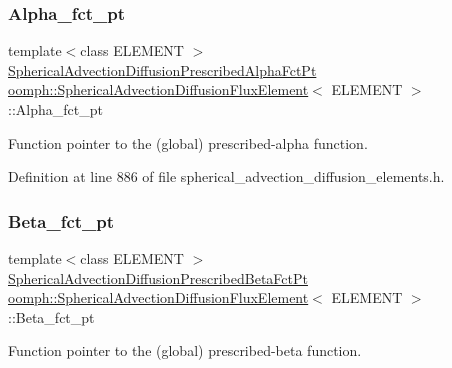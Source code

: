 \subsubsection{\texorpdfstring{Alpha\+\_\+fct\+\_\+pt}{Alpha\_fct\_pt}}
{\footnotesize\ttfamily template$<$class E\+L\+E\+M\+E\+NT $>$ \\
\hyperlink{classoomph_1_1SphericalAdvectionDiffusionFluxElement_aabc503a4eeac639334283e7297b88423}{Spherical\+Advection\+Diffusion\+Prescribed\+Alpha\+Fct\+Pt} \hyperlink{classoomph_1_1SphericalAdvectionDiffusionFluxElement}{oomph\+::\+Spherical\+Advection\+Diffusion\+Flux\+Element}$<$ E\+L\+E\+M\+E\+NT $>$\+::Alpha\+\_\+fct\+\_\+pt\hspace{0.3cm}{\ttfamily [private]}}



Function pointer to the (global) prescribed-\/alpha function. 



Definition at line 886 of file spherical\+\_\+advection\+\_\+diffusion\+\_\+elements.\+h.

\mbox{\label{classoomph_1_1SphericalAdvectionDiffusionFluxElement_afac22354e3e360de61691047efe82be3}} 
\subsubsection{\texorpdfstring{Beta\+\_\+fct\+\_\+pt}{Beta\_fct\_pt}}
{\footnotesize\ttfamily template$<$class E\+L\+E\+M\+E\+NT $>$ \\
\hyperlink{classoomph_1_1SphericalAdvectionDiffusionFluxElement_a1fe86f85817dd5621ab510d37b3a8ce8}{Spherical\+Advection\+Diffusion\+Prescribed\+Beta\+Fct\+Pt} \hyperlink{classoomph_1_1SphericalAdvectionDiffusionFluxElement}{oomph\+::\+Spherical\+Advection\+Diffusion\+Flux\+Element}$<$ E\+L\+E\+M\+E\+NT $>$\+::Beta\+\_\+fct\+\_\+pt\hspace{0.3cm}{\ttfamily [private]}}



Function pointer to the (global) prescribed-\/beta function. 



